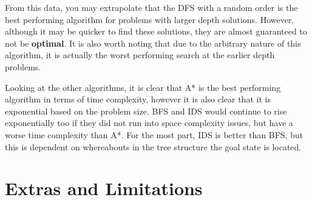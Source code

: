 \documentclass{article}
\begin{document}
	From this data, you may extrapolate that the DFS with a random order is the best performing algorithm for problems with larger depth solutions. However, although it may be quicker to find these solutions, they are almost guaranteed to not be \textbf{optimal}. It is also worth noting that due to the arbitrary nature of this algorithm, it is actually the worst performing search at the earlier depth problems.
	
	Looking at the other algorithms, it is clear that A* is the best performing algorithm in terms of time complexity, however it is also clear that it is exponential based on the problem size. BFS and IDS would continue to rise exponentially too if they did not run into space complexity issues, but have a worse time complexity than A*. For the most part, IDS is better than BFS, but this is dependent on whereabouts in the tree structure the goal state is located.
	
	\newpage
	\section{Extras and Limitations}
	
\end{document}
